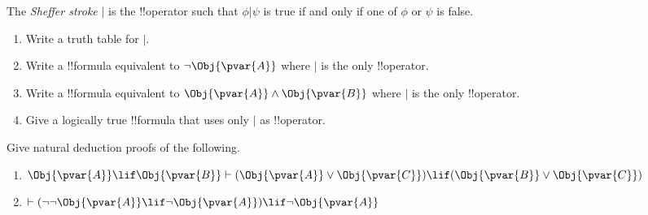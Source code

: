 \documentclass[../../../include/open-logic-section]{subfiles}
\begin{document}
\begin{prob}
    The \emph{Sheffer stroke} $|$ is the !!{operator} such
    that $\phi|\psi$ is true if and only if one of $\phi$ or $\psi$ is
    false. 
    \begin{enumerate}
    \item Write a truth table for $|$.
    \item Write a !!{formula} equivalent to $\lnot \Obj{\pvar{A}}$ where $|$ is the only !!{operator}.
    \item Write a !!{formula} equivalent to $\Obj{\pvar{A}}\land \Obj{\pvar{B}}$ where $|$ is the only !!{operator}.
    \item Give a logically true !!{formula} that uses only $|$ as !!{operator}.
    \end{enumerate}
\end{prob}

\begin{prob}
    Give natural deduction proofs of the following.
    \begin{enumerate}
        \item $\Obj{\pvar{A}}\lif \Obj{\pvar{B}}\vdash(\Obj{\pvar{A}}\lor \Obj{\pvar{C}})\lif(\Obj{\pvar{B}}\lor \Obj{\pvar{C}})$
        \item $\vdash(\lnot\lnot \Obj{\pvar{A}}\lif\lnot \Obj{\pvar{A}})\lif\lnot \Obj{\pvar{A}}$
    \end{enumerate}
\end{prob}
\end{document}
